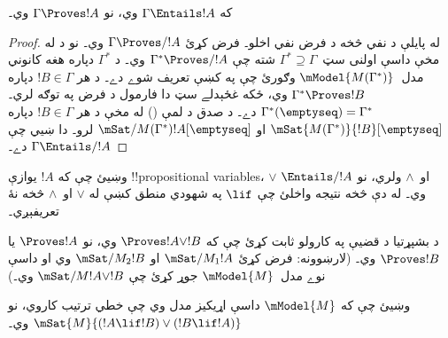 \documentclass[../../../include/open-logic-section]{subfiles}
\begin{document}


\begin{thm}
  که $\Gamma \Entails !A$ وي، نو $\Gamma \Proves !A$ وي۔
\end{thm}

\begin{proof}
  له پايلې د نفي څخه د فرض نفي اخلو۔ فرض کړئ $\Gamma \Proves/ !A$ وي۔ نو د
   له مخې داسې اولنی سټ~$\Gamma^*
  \supseteq \Gamma$ شته چې $\Gamma^* \Proves/ !A$ وي۔ د
  $\Gamma^*$ دپاره هغه کانوني مدل~$\mModel{M(\Gamma^*)}$
  وګورئ چې په  کښې تعريف شوے
  دے۔ د هر $!B \in \Gamma$ دپاره $\Gamma^* \Proves !B$
  وي، ځکه غځېدلے سټ دا فارمول د فرض په توګه لري۔
  $\Gamma^*(\emptyseq) = \Gamma^*$ دے۔ د صدق
  د لمې () له مخې د هر $!B \in \Gamma$
  دپاره $\mSat{M(\Gamma^*)}{!B}[\emptyseq]$ او
  $\mSat/{M(\Gamma^*)}{!A}[\emptyseq]$ لرو۔ دا ښيي چې
  $\Gamma \Entails/ !A$ دے۔
\end{proof}

\begin{prob}
  وښيئ چې که $!A$ يوازې !!{propositional variable}s، $\lor$
  او~$\land$ ولري، نو $\Entails/ !A$ وي۔ له دې څخه نتيجه
  واخلئ چې $\lif$ په شهودي منطق کښې له $\lor$ او~$\land$
  څخه نۀ تعريفېږي۔
\end{prob}
  
\begin{prob}
  د بشپړتيا د قضيې په کارولو ثابت کړئ چې که $\Proves !A \lor !B$
  وي، نو $\Proves !A$ يا $\Proves !B$ وي۔ (لارښوونه: فرض
  کړئ $\mSat/{M_1}{!A}$ او $\mSat/{M_2}{!B}$ وي او داسې
  نوے مدل~$\mModel{M}$ جوړ کړئ چې $\mSat/{M}{!A \lor !B}$ وي۔)
\end{prob}
  
\begin{prob} 
  وښيئ چې که $\mModel{M}$ داسې اړيکيز مدل وي چې خطي ترتيب
  کاروي، نو $\mSat{M}{(!A \lif !B)\lor(!B \lif !A)}$ وي۔
\end{prob}
\end{document}

